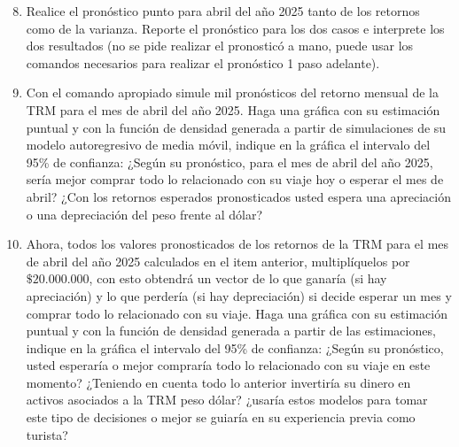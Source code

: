 \documentclass{article}
\theoremstyle{remark}
\theoremstyle{definition}
\begin{document}
\begin{enumerate}[label = \emph{\alph*})]\setcounter{enumi}{7}
    \item {Realice el pron\'ostico punto para abril del año 2025 tanto de los retornos como de la varianza. Reporte el pron\'ostico para los dos casos e interprete los dos resultados (no se pide realizar el pronostic\'o a mano, puede usar los comandos necesarios para realizar el pron\'ostico 1 paso adelante).}
        \begin{tcolorbox}[title=Soluci\'on 2.h]
            
        \end{tcolorbox}
    \item {Con el comando apropiado simule mil pron\'osticos del retorno mensual de la TRM para el mes de abril del año 2025. Haga una gr\'afica con su estimaci\'on puntual y con la funci\'on de densidad generada a partir de simulaciones de su modelo autoregresivo de media m\'ovil, indique en la gr\'afica el intervalo del 95\% de confianza: ¿Seg\'un su pron\'ostico, para el mes de abril del año 2025, ser\'ia mejor comprar todo lo relacionado con su viaje hoy o esperar el mes de abril? ¿Con los retornos esperados pronosticados usted espera una apreciaci\'on o una depreciaci\'on del peso frente al d\'olar?}
        \begin{tcolorbox}[title=Soluci\'on 2.i]
            
        \end{tcolorbox}
    \item {Ahora, todos los valores pronosticados de los retornos de la TRM para el mes de abril del año 2025 calculados en el item anterior, multipl\'iquelos por $\$20.000.000$, con esto obtendr\'a un vector de lo que ganar\'ia (si hay apreciaci\'on) y lo que perder\'ia (si hay depreciaci\'on) si decide esperar un mes y comprar todo lo relacionado con su viaje. Haga una gr\'afica con su estimaci\'on puntual y con la funci\'on de densidad generada a partir de las estimaciones, indique en la gr\'afica el intervalo del 95\% de confianza: ¿Seg\'un su pron\'ostico, usted esperar\'ia o mejor comprar\'ia todo lo relacionado con su viaje en este momento? ¿Teniendo en cuenta todo lo anterior invertir\'ia su dinero en activos asociados a la TRM peso d\'olar? ¿usar\'ia estos modelos para tomar este tipo de decisiones o mejor se guiar\'ia en su experiencia previa como turista?}
        \begin{tcolorbox}[title=Soluci\'on 2.j]
            
        \end{tcolorbox}
\end{enumerate}
\end{document}

